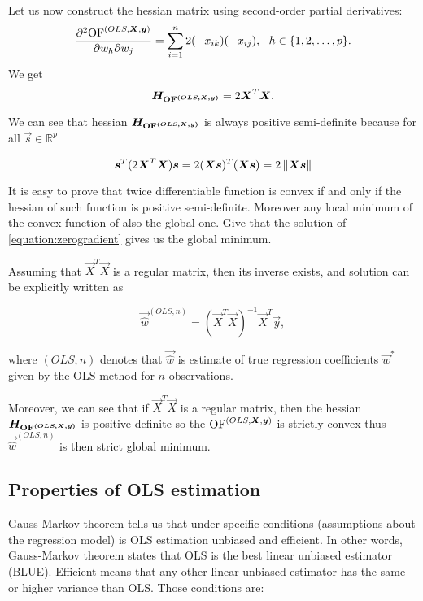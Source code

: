 Let us now construct the hessian matrix using second-order partial derivatives:
\begin{equation}
    \frac{\partial^2{\operatorname{OF}^{(OLS,\boldsymbol{X}, \boldsymbol{y})}} }{\partial w_h\partial w_j} = \sum\limits_{i=1}^n 2(- x_{ik})(-x_{ij}) \\, \ \ h \in \{{1,2,\ldots,p\}}. 
\end{equation}
We get 
\begin{equation}
    \boldsymbol{H_{\operatorname{OF}^{(OLS,\boldsymbol{X}, \boldsymbol{y})}}} = 2\boldsymbol{X}^T\boldsymbol{X}.
\end{equation}

We can see that hessian $\boldsymbol{H_{\operatorname{OF}^{(OLS,\boldsymbol{X}, \boldsymbol{y})}}}$ is always positive semi-definite because for all $\vec{s} \in \mathbb{R}^p$

\begin{equation}
    \boldsymbol{s}^T(2\boldsymbol{X}^T\boldsymbol{X})\boldsymbol{s} = 2(\boldsymbol{X}\boldsymbol{s})^T(\boldsymbol{X}\boldsymbol{s}) =  2 \left\lVert\boldsymbol{X}\boldsymbol{s}\right\rVert
\end{equation}

It is easy to prove that twice differentiable function is convex if and only if the hessian of such function is positive semi-definite. Moreover any local minimum of the convex function of also the global one. Give that the solution of \eqref{equation:zerogradient} gives us the global minimum. 

Assuming that $\vec{X}^T\vec{X}$ is a regular matrix, then its inverse exists, and solution can be explicitly written as

\begin{equation} \label{wols}
    \vec{\hat{w}}^{(OLS,n)} = (\vec{X}^T\vec{X})^{-1}\vec{X}^T\vec{y}, 
\end{equation}

where $(OLS,n)$ denotes that $\vec{\hat{w}}$ is estimate of true regression coefficients $\vec{w}^*$  given by the OLS method for $n$ observations. 

Moreover, we can see that if $\vec{X}^T\vec{X}$ is a regular matrix, then the hessian $\boldsymbol{H_{\operatorname{OF}^{(OLS,\boldsymbol{X}, \boldsymbol{y})}}}$ is positive definite so the $\operatorname{OF}^{(OLS,\boldsymbol{X}, \boldsymbol{y})}$ is strictly convex thus $\vec{\hat{w}}^{(OLS,n)}$ is then strict global minimum.


\subsection{Properties of OLS estimation}
Gauss-Markov theorem tells us that under specific conditions (assumptions about the regression model) is OLS estimation unbiased and efficient. In other words, Gauss-Markov theorem states that OLS is the best linear unbiased estimator (BLUE). Efficient means that any other linear unbiased estimator has the same or higher variance than OLS.  Those conditions are:

